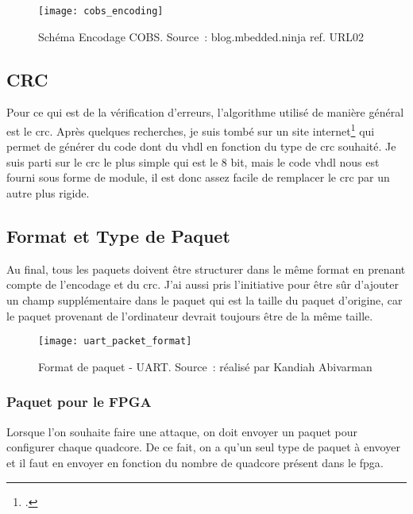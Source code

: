 \begin{figure}[tbph!]
	\centering
	\texttt{[image: cobs\_encoding]}
	\caption[Schéma Encodage COBS]{Schéma Encodage COBS. Source : blog.mbedded.ninja ref. URL02}
	\label{fig:cobs_encoding}
\end{figure}

\subsection{CRC}

Pour ce qui est de la vérification d'erreurs, l'algorithme utilisé de manière général est le \gls{crc}.
Après quelques recherches, je suis tombé sur un site internet\footcite{noauthor_generator_nodate} qui permet de générer du code dont du \gls{vhdl} en fonction du type de \gls{crc} souhaité.
Je suis parti sur le \gls{crc} le plus simple qui est le 8 bit, mais le code \gls{vhdl} nous est fourni sous forme de module, il est donc assez facile de remplacer le \gls{crc} par un autre plus rigide.

\newpage

\subsection{Format et Type de Paquet}

Au final, tous les paquets doivent être structurer dans le même format en prenant compte de l'encodage et du \gls{crc}. 
J'ai aussi pris l'initiative pour être sûr d'ajouter un champ supplémentaire dans le paquet qui est la taille du paquet d'origine, car le paquet provenant de l'ordinateur devrait toujours être de la même taille. 

\begin{figure}[tbph!]
	\centering
	\texttt{[image: uart\_packet\_format]}
	\caption[Format de paquet - UART]{Format de paquet - UART. Source : réalisé par Kandiah Abivarman}
	\label{fig:uart_packet_format}
\end{figure}


\subsubsection{Paquet pour le FPGA}

Lorsque l'on souhaite faire une attaque, on doit envoyer un paquet pour configurer chaque quadcore.
De ce fait, on a qu'un seul type de paquet à envoyer et il faut en envoyer en fonction du nombre de quadcore présent dans le \gls{fpga}.

